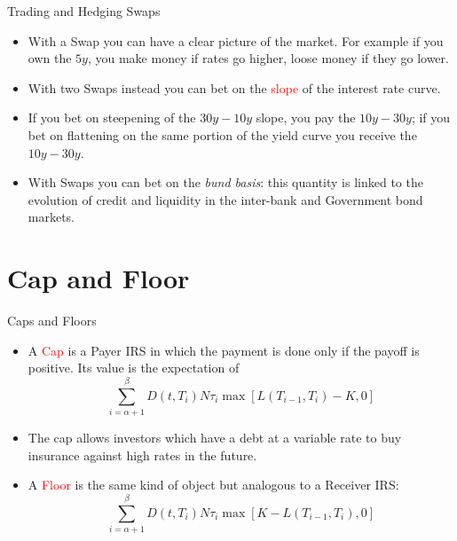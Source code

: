 \documentclass{beamer}
\begin{document}
\begin{frame}{Trading and Hedging Swaps}
	\begin{itemize}
		\item With a Swap you can have a clear picture of the market. For example if you own the $5y$, you make money if rates go higher, loose money if they go lower.
		\item With two Swaps instead you can bet on the \textcolor{red}{slope} of the interest rate curve.
		\item If you bet on steepening of the $30y-10y$ slope, you pay the $10y-30y$; if you bet on flattening on the same portion of the yield curve you receive the $10y-30y$.		
		\item With Swaps you can bet on the \emph{bund basis}: this quantity is linked to the evolution of credit and liquidity in the inter-bank and Government bond markets.
	\end{itemize}
\end{frame}


\section{Cap and Floor}
\begin{frame}{Caps and Floors}
	\begin{itemize}
		\item<1-> A \textcolor{red}{Cap} is a Payer IRS in which the payment is done only if the payoff is positive. Its value is the expectation of 
		\begin{equation}
			\sum_{i=\alpha+1}^{\beta}D(t,T_i)N\tau_i\max\left[L(T_{i-1},T_i)-K,0\right]
			\label{eq:cap}
		\end{equation} 
		\item<2-> The cap allows investors which have a debt at a variable rate to buy insurance against high rates in the future.
		\item<3-> A \textcolor{red}{Floor} is the same kind of object but analogous to a Receiver IRS:
		\begin{equation}
			\sum_{i=\alpha+1}^{\beta}D(t,T_i)N\tau_i\max\left[K-L(T_{i-1},T_i),0\right]
			\label{eq:floor}
		\end{equation} 
	\end{itemize}
\end{frame}
\end{document}
